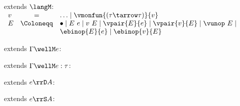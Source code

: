 \begin{flushleft}

 extends $\langM$:\\
$\begin{array}{l c l}
  v & = & \ldots \mid \vmonfun{(\tau\tarrow\tau)}{v}
\\
  E & \Coloneqq & \bullet \mid E~e \mid v~E \mid
                  \vpair{E}{e} \mid \vpair{v}{E} \mid \vunop~E \mid
\\ & &            \ebinop{E}{e} \mid \ebinop{v}{E}
\end{array}$

\medskip
\begin{minipage}[t]{0.5\textwidth}
 extends $\Gamma \wellM e$:
\begin{mathpar}
\end{mathpar}
\end{minipage}%
\begin{minipage}[t]{0.5\textwidth}
 extends $\Gamma \wellM e : \tau$:
\begin{mathpar}
\end{mathpar}
\end{minipage}

\medskip
\begin{minipage}[t]{0.5\textwidth}
 extends $e \rrD A$:
\begin{mathpar}
\end{mathpar}
\end{minipage}%
\begin{minipage}[t]{0.5\textwidth}
 extends $e \rrS A$:
\begin{mathpar}
\end{mathpar}
\end{minipage}%


\end{flushleft}
